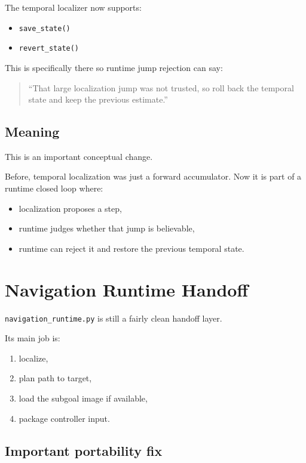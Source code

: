 \documentclass[11pt,a4paper]{article}
\begin{document}
The temporal localizer now supports:

\begin{itemize}[nosep]
  \item \texttt{save\_state()}
  \item \texttt{revert\_state()}
\end{itemize}

This is specifically there so runtime jump rejection can say:

\begin{quote}
``That large localization jump was not trusted, so roll back the temporal
state and keep the previous estimate.''
\end{quote}

\subsection{Meaning}

This is an important conceptual change.

Before, temporal localization was just a forward accumulator.
Now it is part of a runtime closed loop where:

\begin{itemize}[nosep]
  \item localization proposes a step,
  \item runtime judges whether that jump is believable,
  \item runtime can reject it and restore the previous temporal state.
\end{itemize}


\section{Navigation Runtime Handoff}

\texttt{navigation\_runtime.py} is still a fairly clean handoff layer.

Its main job is:

\begin{enumerate}[nosep]
  \item localize,
  \item plan path to target,
  \item load the subgoal image if available,
  \item package controller input.
\end{enumerate}

\subsection{Important portability fix}
\end{document}
